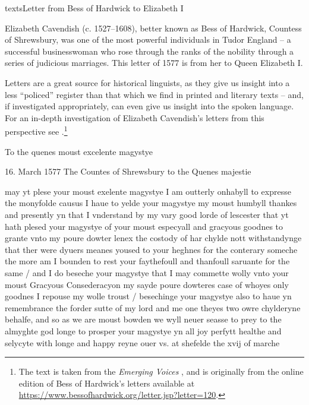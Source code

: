 \begin{texts}{texts}{Letter from Bess of Hardwick to Elizabeth I}

Elizabeth Cavendish (c. 1527--1608), better known as Bess of Hardwick, Countess of Shrewsbury, was one of the most powerful individuals in Tudor England -- a successful businesswoman who rose through the ranks of the nobility through a series of judicious marriages. This letter of 1577 is from her to Queen Elizabeth I.

Letters are a great source for historical linguists, as they give us insight into a less ``policed'' register than that which we find in printed and literary texts -- and, if investigated appropriately, can even give us insight into the spoken language. For an in-depth investigation of Elizabeth Cavendish's letters from this perspective see \citet{Marcus2018}.\footnote{The text is taken from the \emph{Emerging Voices}  \citep{Walkden2019}, and is originally from the online edition of Bess of Hardwick's letters available at \url{https://www.bessofhardwick.org/letter.jsp?letter=120}.}

\begin{textglossed}
    \internallinenumbers*{}
    To the quenes moust excelente magystye

    16. March 1577 The Countes of Shrewsbury to the Quenes majestie

    may yt plese your moust exelente magystye I am outterly onhabyll to expresse the monyfolde causus I haue to yelde your magystye my moust humbyll thankes and presently yn that I vnderstand by my vary good lorde of lescester that yt hath plesed your magystye of your moust especyall and gracyous goodnes to grante vnto my poure dowter lenex the costody of har chylde nott withstandynge that ther were dyuers meanes yoused to your heghnes for the conterary someche the more am I bounden to rest your faythefoull and thanfoull saruante for the same / and I do beseche your magystye that I may commette wolly vnto your moust Gracyous Consederacyon my sayde poure dowteres case of whoyes only goodnes I repouse my wolle troust / besechinge your magystye also to haue yn remembrance the forder sutte of my lord and me one theyes two owre chylderyne behalfe, and so as we are moust bowden we wyll neuer seasse to prey to the almyghte god longe to prosper your magystye yn all joy perfytt healthe and selycyte with longe and happy reyne ouer vs. at shefelde the xvij of marche


\end{textglossed}
\end{texts}

